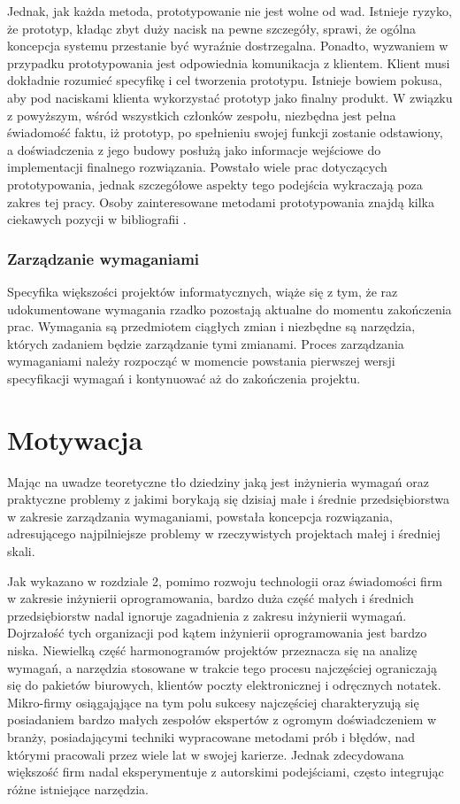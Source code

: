         Jednak, jak każda metoda, prototypowanie nie jest wolne od wad. Istnieje ryzyko, że prototyp, kładąc zbyt duży nacisk na pewne szczegóły, sprawi, że ogólna koncepcja systemu przestanie być wyraźnie dostrzegalna. Ponadto, wyzwaniem w przypadku prototypowania jest odpowiednia komunikacja z klientem. Klient musi dokładnie rozumieć specyfikę i cel tworzenia prototypu. Istnieje bowiem pokusa, aby pod naciskami klienta wykorzystać prototyp jako finalny produkt. W związku z powyższym, wśród wszystkich członków zespołu, niezbędna jest pełna świadomość faktu, iż prototyp, po spełnieniu swojej funkcji zostanie odstawiony, a doświadczenia z jego budowy posłużą jako informacje wejściowe do implementacji finalnego rozwiązania. Powstało wiele prac dotyczących prototypowania, jednak szczegółowe aspekty tego podejścia wykraczają poza zakres tej pracy. Osoby zainteresowane metodami prototypowania znajdą kilka ciekawych pozycji w bibliografii \cite{arnowitz2006effective, budde1992prototyping}.

      \subsubsection{Zarządzanie wymaganiami}

        Specyfika większości projektów informatycznych, wiąże się z tym, że raz udokumentowane wymagania rzadko pozostają aktualne do momentu zakończenia prac. Wymagania są przedmiotem ciągłych zmian i niezbędne są narzędzia, których zadaniem będzie zarządzanie tymi zmianami. Proces zarządzania wymaganiami należy rozpocząć w momencie powstania pierwszej wersji specyfikacji wymagań i kontynuować aż do zakończenia projektu.

  \section{Motywacja}

    Mając na uwadze teoretyczne tło dziedziny jaką jest inżynieria wymagań oraz praktyczne problemy z jakimi borykają się dzisiaj małe i średnie przedsiębiorstwa w zakresie zarządzania wymaganiami, powstała koncepcja rozwiązania, adresującego najpilniejsze problemy w rzeczywistych projektach małej i średniej skali. 

    Jak wykazano w rozdziale 2, pomimo rozwoju technologii oraz świadomości firm w zakresie inżynierii oprogramowania, bardzo duża część małych \linebreak i średnich przedsiębiorstw nadal ignoruje zagadnienia z zakresu inżynierii wymagań. Dojrzałość tych organizacji pod kątem inżynierii oprogramowania jest bardzo niska. Niewielką część harmonogramów projektów przeznacza się na analizę wymagań, a narzędzia stosowane w trakcie tego procesu najczęściej ograniczają się do pakietów biurowych, klientów poczty elektronicznej i odręcznych notatek. Mikro-firmy osiągająjące na tym polu sukcesy najczęściej charakteryzują się posiadaniem bardzo małych zespołów ekspertów z ogromym doświadczeniem w branży, posiadającymi techniki wypracowane metodami prób i błędów, nad którymi pracowali przez wiele lat w swojej karierze.  Jednak zdecydowana większość firm nadal eksperymentuje z autorskimi podejściami, często integrując różne istniejące narzędzia. 
    
